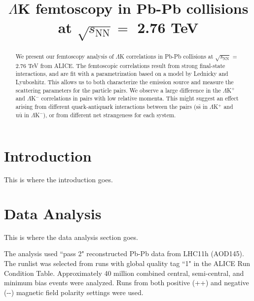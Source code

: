 \documentclass[ALICE,manyauthors]{cernphprep}
\begin{document}
%

\begin{titlepage}
%
%

\title{$\Lambda$K femtoscopy in Pb-Pb collisions at $\sqrt{s_{\mathrm{NN}}} = $ 2.76 TeV}


\begin{abstract}
We present our femtoscopy analysis of $\Lambda$K correlations in Pb-Pb collisions at $\sqrt{s_{\mathrm{NN}}}$ = 2.76 TeV from ALICE.  The femtoscopic correlations result from strong final-state interactions, and are fit with a parametrization based on a model by Lednicky and Lyuboshitz.  This allows us to both characterize the emission source and measure the scattering parameters for the particle pairs.  We observe a large difference in the $\Lambda$K$^{+}$ and $\Lambda$K$^{-}$ correlations in pairs with low relative momenta.  This might suggest an effect arising from different quark-antiquark interactions between the pairs ($\mathrm{s}\bar{\mathrm{s}}$ in $\Lambda$K$^{+}$ and $\mathrm{u}\bar{\mathrm{u}}$ in $\Lambda$K$^{-}$), or from different net strangeness for each system.
\end{abstract}
\end{titlepage}
\setcounter{page}{2}

\section{Introduction}
\label{sec:Introduction}
This is where the introduction goes.

\section{Data Analysis}
\label{sec:DataAnalysis}
This is where the data analysis section goes.

The analysis used ``pass 2" reconstructed Pb-Pb data from LHC11h (AOD145).
The runlist was selected from runs with global quality tag ``1" in the ALICE Run Condition Table.
Approximately 40 million combined central, semi-central, and minimum bias events were analyzed.
Runs from both positive (++) and negative (-{}-) magnetic field polarity settings were used.
\end{document}
